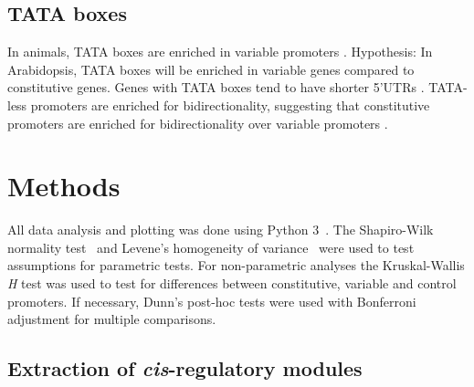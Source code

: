 \documentclass[../main.tex]{subfiles}
\begin{document}
\subsection{TATA boxes}
\label{chapter1:introduction:tata-boxes}
In animals, TATA boxes are enriched in variable promoters \autocite{engstromGenomicRegulatoryBlocks2007,carninciGenomewideAnalysisMammalian2006}.
Hypothesis: In Arabidopsis, TATA boxes will be enriched in variable genes compared to constitutive genes.
Genes with TATA boxes tend to have shorter 5'UTRs \autocite{molinaGenomeWideAnalysis2005,lichtenbergWordLandscapeNoncoding2009}.
TATA-less promoters are enriched for bidirectionality, suggesting that constitutive promoters are enriched for bidirectionality over variable promoters \autocite{dhadiGenomewideComparativeAnalysis2009}.

\section{Methods}
\label{chapter1:methods}


All data analysis and plotting was done using Python 3~\autocite{pythoncoreteamPythonDynamicOpen2020}.
The Shapiro\hyp{}Wilk normality test~\autocite{shapiroAnalysisVarianceTest1965} and Levene's homogeneity of variance~\autocite{leveneRobustTestsEquality1960} were used to test assumptions for parametric tests.
For non\hyp{}parametric analyses the Kruskal\hyp{}Wallis \textit{H} test \autocite{kruskalUseRanksOneCriterion1952} was used to test for differences between constitutive, variable and control promoters.
If necessary, Dunn's post\hyp{}hoc tests \autocite{dunnMultipleComparisonsUsing1964} were used with Bonferroni adjustment for multiple comparisons.

\subsection{Extraction of \textit{cis}-regulatory modules}\label{chapter1:methods:extraction-of-cis-regulatory-modules}
\end{document}
